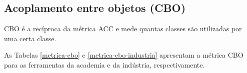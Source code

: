 

\subsection{Acoplamento entre objetos (CBO)}

CBO é a recíproca da métrica ACC e mede quantas classes são utilizadas por uma
certa classe.

As Tabelas \ref{metrica-cbo} e \ref{metrica-cbo-industria} apresentam a
métrica CBO para as ferramentas da academia e da indústria, respectivamente.



